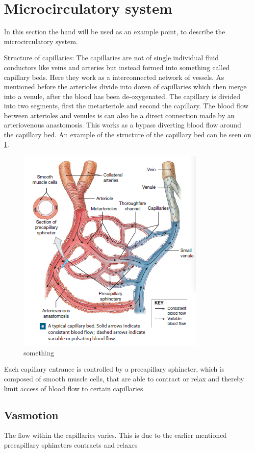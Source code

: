 
\section{Microcirculatory system}

In this section the hand will be used as an example point, to describe the microcirculatory system. 

Structure of capillaries: 
The capillaries are not of single individual fluid conductors like veins and arteries but instead formed into something called capillary beds. Here they work as a interconnected network of vessels. As mentioned before the arterioles divide into dozen of capillaries which then merge into a venule, after the blood has been de-oxygenated. The capillary is divided into two segments, first the metarteriole and second the capillary. The blood flow between arterioles and venules is can also be a direct connection made by an arteriovenous anastomosis. This works as a bypass diverting blood flow around the capillary bed. An example of the structure of the capillary bed can be seen on \cref{fig:beds}.\cite{martini2012}
\begin{figure}[H]                                         
	\includegraphics[width=.6\textwidth]{figures/capillary_bed}  
	\caption{something }
	\label{fig:beds}  
\end{figure}          

Each capillary entrance is controlled by a precapillary sphincter, which is composed of smooth muscle cells, that are able to contract or relax and thereby limit access of blood flow to certain capillaries.\cite{martini2012}

\subsection{Vasmotion}

The flow within the capillaries varies. This is due to the earlier mentioned precapillary sphincters contracts and relaxes     








